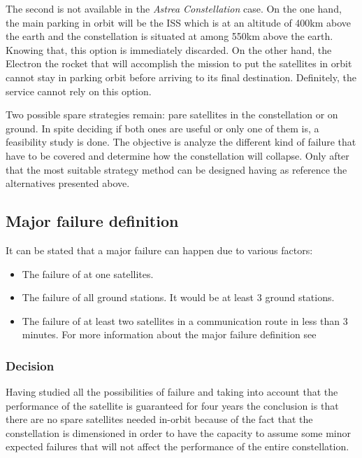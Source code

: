 The second is not available in the \textit{Astrea Constellation} case. On the one hand, the main parking in orbit will be the ISS which is at an altitude of 400km above the earth and the constellation is situated at among 550km above the earth. Knowing that, this option is immediately discarded. On the other hand, the Electron the rocket that will accomplish the mission to put the satellites in orbit cannot stay in parking orbit before arriving to its final destination. Definitely, the service cannot rely on this option.

Two possible spare strategies remain: pare satellites in the constellation or on ground. In spite deciding if both ones are useful or only one of them is, a feasibility study is done. The objective is analyze the different kind of failure that have to be covered and determine how the constellation will collapse. Only after that the most suitable strategy method can be designed having as reference the alternatives presented above. 

\subsection{Major failure definition}
It can be stated that a major failure can happen due to various factors:
\begin{itemize}
\item The failure of at one satellites.
\item The failure of all ground stations. It would be at least 3 ground stations.
\item The failure of at least two satellites in a communication route in less than 3 minutes.
\newline\newline
For more information about the major failure definition see \cite[Chapter 1, Section 4]{annex2}
\end{itemize}

\subsubsection{Decision}
Having studied all the possibilities of failure and taking into account that the performance of the satellite is guaranteed for four years the conclusion is that there are no spare satellites needed in-orbit because of the fact that the constellation is dimensioned in order to have the capacity to assume some minor expected failures that will not affect the performance of the entire constellation.


